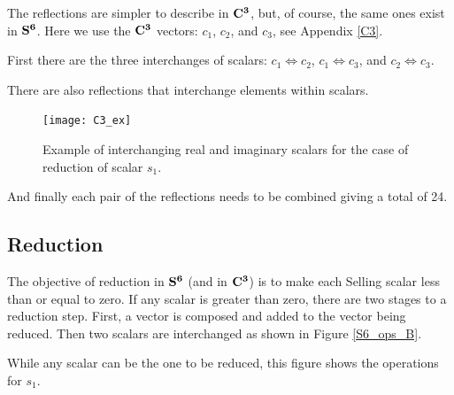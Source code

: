 \documentclass[preprint]{iucr}              %
\numberwithin{equation}{section}
\newcommand{\SVI}[0]{$\bf{S^{6}}$}
\newcommand{\CIII}[0]{$\bf{C^{3}}$}
\begin{document}
	The reflections are simpler to describe in \CIII{}, but,
	of course, the same ones exist in \SVI{}. Here we use the \CIII{} vectors: $c_1$, $c_2$, and $c_3$, see Appendix \ref{C3}.
	
First there are the three interchanges of scalars: $c_1\Longleftrightarrow c_2$, $c_1\Longleftrightarrow c_3$, 
and $c_2\Longleftrightarrow c_3$.

There are also reflections that interchange elements within 
scalars.
\begin{figure}
		\texttt{[image: C3\_ex]}
%
% 

	\caption{Example of interchanging real and imaginary scalars
	for the case of reduction of scalar $s_1$.}
	
\end{figure}



And finally each pair of the reflections needs to be combined
giving a total of 24.


\subsection{Reduction}
\label{reduction}

The objective of reduction in \SVI{} (and in \CIII{}) is to
make each Selling scalar less than or equal to zero.
If any scalar is greater than zero, there are two stages
to a reduction step. First,
a vector is composed and added to the vector being reduced.
Then two scalars are interchanged as shown in Figure \ref{S6_ops_B}.

While any scalar can be the one to be reduced, this figure shows
the operations for $s_1$.
\end{document}
